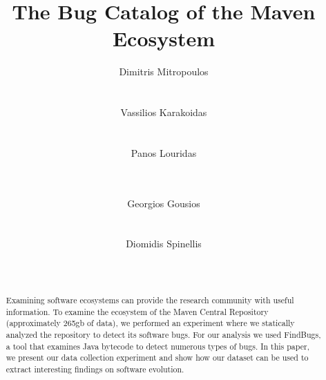 \documentclass{sig-alternate}
\begin{document}
\title{The Bug Catalog of the Maven Ecosystem}


\author{
\alignauthor
Dimitris Mitropoulos\\
       \\
       \\
\alignauthor Vassilios Karakoidas\\
       \\
       \\
\alignauthor Panos Louridas\\
       \\
       \\
\and  %
\alignauthor Georgios Gousios\\
       \\
       \\
\alignauthor Diomidis Spinellis\\
       \\
       \\
}

\maketitle
\begin{abstract}
Examining software ecosystems can provide the research community
with useful information. To examine the ecosystem of
the Maven Central Repository (approximately 265{\sc gb} of data),
we performed an experiment where we statically analyzed the
repository to detect its software bugs. For our analysis we
used FindBugs, a tool that examines Java bytecode to detect
numerous types of bugs. In this paper, we present our data
collection experiment and show how our dataset can be used
to extract interesting findings on software evolution.
\end{abstract}
\end{document}
